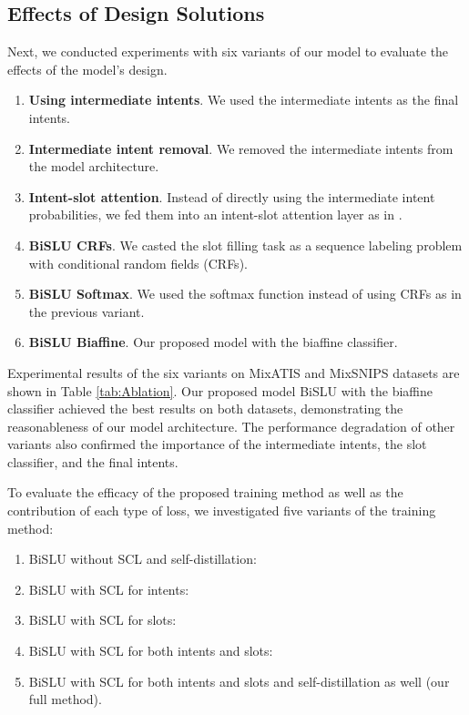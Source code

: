 \documentclass{ecai}
\begin{document}
\subsection{Effects of Design Solutions}

Next, we conducted experiments with six variants of our model to evaluate the effects of the model’s design.
\begin{enumerate}
    \item \textbf{Using intermediate intents}. We used the intermediate intents as the final intents. 
    \item \textbf{Intermediate intent removal}. We removed the intermediate intents from the model architecture. 
    \item \textbf{Intent-slot attention}. Instead of directly using the intermediate intent probabilities, we fed them into an intent-slot attention layer as in \cite{Dao:2021}.
    \item \textbf{BiSLU CRFs}. We casted the slot filling task as a sequence labeling problem with conditional random fields (CRFs).
    \item \textbf{BiSLU Softmax}. We used the softmax function instead of using CRFs as in the previous variant. 
    \item \textbf{BiSLU Biaffine}. Our proposed model with the biaffine classifier. 
\end{enumerate}

Experimental results of the six variants on MixATIS and MixSNIPS datasets are shown in Table \ref{tab:Ablation}. Our proposed model BiSLU with the biaffine classifier achieved the best results on both datasets, demonstrating the reasonableness of our model architecture. The performance degradation of other variants also confirmed the importance of the intermediate intents, the slot classifier, and the final intents.  

To evaluate the efficacy of the proposed training method as well as the contribution of each type of loss, we investigated five variants of the training method:
\begin{enumerate}
    \item BiSLU without SCL and self-distillation: 
    \item BiSLU with SCL for intents: 
    \item BiSLU with SCL for slots:
    \item BiSLU with SCL for both intents and slots:
    \item BiSLU with SCL for both intents and slots and self-distillation as well (our full method).   
\end{enumerate}
\end{document}
